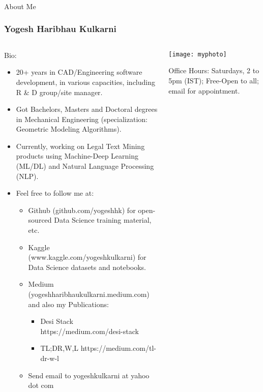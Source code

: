 \begin{frame}[fragile]\frametitle{}
\begin{center}
{\Large About Me}
\end{center}
\end{frame}

\begin{frame}[fragile]\frametitle{Yogesh Haribhau Kulkarni}
\begin{columns}
    \begin{column}[T]{0.6\linewidth}
		Bio:
      \begin{itemize}
		\item 20+ years in CAD/Engineering software development, in various capacities, including R \& D group/site manager. 
		\item Got Bachelors, Masters and Doctoral degrees in Mechanical Engineering (specialization: Geometric Modeling Algorithms). 
		\item Currently, working on Legal Text Mining products using Machine-Deep Learning (ML/DL) and Natural Language Processing (NLP).
		\item Feel free to follow me at:
      \begin{itemize}
			\item Github (github.com/yogeshhk) for open-sourced Data Science training material, etc.
			\item Kaggle (www.kaggle.com/yogeshkulkarni) for Data Science datasets and notebooks.
			\item Medium (yogeshharibhaukulkarni.medium.com) and also my Publications:
				\begin{itemize}
				\item Desi Stack https://medium.com/desi-stack
				\item TL;DR,W,L https://medium.com/tl-dr-w-l
				\end{itemize}
			\item Send email to yogeshkulkarni at yahoo dot com
			\end{itemize}
	  \end{itemize}
    \end{column}
		
    \begin{column}[T]{0.4\linewidth}
      \centering
      \texttt{[image: myphoto]}
			
			Office Hours: Saturdays, 2 to 5pm (IST); Free-Open to all; email for appointment.
    \end{column}
		
  \end{columns}

\end{frame}


